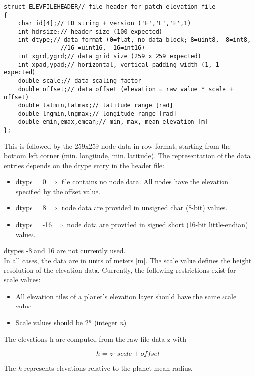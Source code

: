 \documentclass[Orbiter Developer Manual.tex]{subfiles}
\begin{document}
\begin{lstlisting}
struct ELEVFILEHEADER// file header for patch elevation file
{
	char id[4];// ID string + version ('E','L','E',1)
	int hdrsize;// header size (100 expected)
	int dtype;// data format (0=flat, no data block; 8=uint8, -8=int8,
				//16 =uint16, -16=int16)
	int xgrd,ygrd;// data grid size (259 x 259 expected)
	int xpad,ypad;// horizontal, vertical padding width (1, 1 expected)
	double scale;// data scaling factor
	double offset;// data offset (elevation = raw value * scale + offset)
	double latmin,latmax;// latitude range [rad]
	double lngmin,lngmax;// longitude range [rad]
	double emin,emax,emean;// min, max, mean elevation [m]
};
\end{lstlisting}

\noindent
This is followed by the 259x259 node data in row format, starting from the bottom left corner (min. longitude, min. latitude). The representation of the data entries depends on the dtype entry in the header file:

\begin{itemize}
\item dtype = 0 $\Rightarrow$ file contains no node data. All nodes have the elevation specified by the offset value.
\item dtype = 8 $\Rightarrow$ node data are provided in unsigned char (8-bit) values.
\item dtype = -16 $\Rightarrow$ node data are provided in signed short (16-bit little-endian) values.
\end{itemize}

\noindent
dtypes -8 and 16 are not currently used.\\
In all cases, the data are in units of meters [m]. The scale value defines the height resolution of the elevation data. Currently, the following restrictions exist for scale values:

\begin{itemize}
\item All elevation tiles of a planet's elevation layer should have the same scale value.
\item Scale values should be 2$^{n}$ (integer \textit{n})
\end{itemize}

\noindent
The elevations h are computed from the raw file data z with

\[ h = z \cdot scale + offset \]

\noindent
The \textit{h} represents elevations relative to the planet mean radius.
\end{document}
